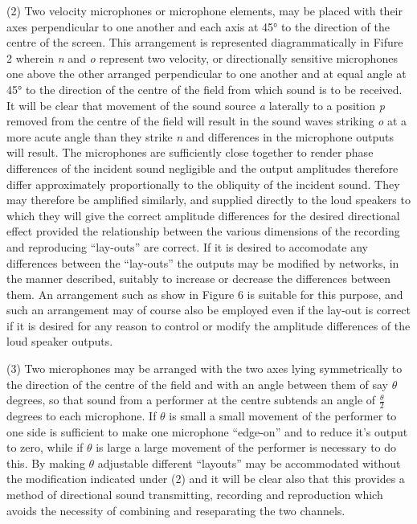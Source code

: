 \documentclass[11pt]{article}
\begin{document}
\begin{multicols*}{2}
(2) Two velocity microphones or microphone elements, may be placed with their axes perpendicular to one another and each axis at 45° to the direction of the centre of the screen. This arrangement is represented diagrammatically in Fifure 2 wherein \textit{n} and \textit{o} represent two velocity, or directionally sensitive microphones one above the other arranged perpendicular to one another and at equal angle at 45° to the direction of the centre of the field from which sound is to be received. It will be clear that movement of the sound source \textit{a} laterally to a position \textit{p} removed from the centre of the field will result in the sound waves striking \textit{o} at a more acute angle than they strike \textit{n} and differences in the microphone outputs will result. The microphones are sufficiently close together to render phase differences of the incident sound negligible and the output amplitudes therefore differ approximately proportionally to the obliquity of the incident sound. They may therefore be amplified similarly, and supplied directly to the loud speakers to which they will give the correct amplitude differences for the desired directional effect provided the relationship between the various dimensions of the recording and reproducing “lay-outs” are correct. If it is desired to accomodate any differences between the “lay-outs” the outputs may be modified by networks, in the manner described, suitably to increase or decrease the differences between them. An arrangement such as show in Figure 6 is suitable for this purpose, and such an arrangement may of course also be employed even if the lay-out is correct if it is desired for any reason to control or modify the amplitude differences of the loud speaker outputs.

 (3) Two microphones may be arranged with the two axes lying symmetrically to the direction of the centre of the field and with an angle between them of say $\theta$ degrees, so that sound from a performer at the centre subtends an angle of $\frac{\theta}{2}$ degrees to each microphone. If $\theta$ is small a small movement of the performer to one side is sufficient to make one microphone “edge-on” and to reduce it’s output to zero, while if $\theta$ is large a large movement of the performer is necessary to do this. By making $\theta$ adjustable different “layouts” may be accommodated without the modification indicated under (2) and it will be clear also that this provides a method of directional sound transmitting, recording and reproduction which avoids the necessity of combining and reseparating the two channels.
 

\end{multicols*}
\end{document}
